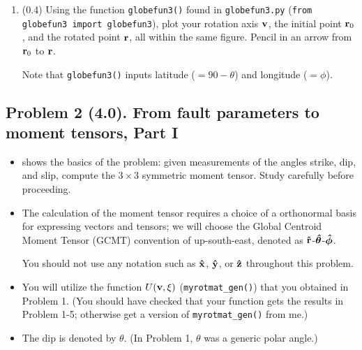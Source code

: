 \documentclass[11pt,titlepage,fleqn]{article}
\newcommand{\rotangB}{\xi}    %
\newcommand{\rotvec}{\bv}      %
\newcommand{\Umat}{U}
\begin{document}
\begin{enumerate}
\item (0.4) Using the function \verb+globefun3()+ found in \verb+globefun3.py+ (\verb+from globefun3 import globefun3+), plot your rotation axis $\rotvec$, the initial point $\mbox{${\bf r}$}_0$, and the rotated point $\mbox{${\bf r}$}$, all within the same figure. Pencil in an arrow from $\mbox{${\bf r}$}_0$ to $\mbox{${\bf r}$}$.

Note that \verb+globefun3()+ inputs latitude ($=90-\theta$) and longitude ($=\phi$).

\end{enumerate}


\subsection*{Problem 2 (4.0). From fault parameters to moment tensors, Part I}

\begin{itemize}
\item {} shows the basics of the problem: given measurements of the angles strike, dip, and slip, compute the $3 \times 3$ symmetric moment tensor. Study  carefully before proceeding.

\item The calculation of the moment tensor requires a choice of a orthonormal basis for expressing vectors and tensors; we will choose the Global Centroid Moment Tensor (GCMT) convention of up-south-east, denoted as $\mbox{\boldmath{$\hat{\rm r}$}}$-$\mbox{\boldmath{$\hat{\theta}$}}$-$\mbox{\boldmath{$\hat{\phi}$}}$.

You should not use any notation such as $\mbox{\boldmath{$\hat{\rm x}$}}$, $\mbox{\boldmath{$\hat{\rm y}$}}$, or $\mbox{\boldmath{$\hat{\rm z}$}}$ throughout this problem.

\item You will utilize the function $\Umat(\rotvec,\rotangB)$ (\verb+myrotmat_gen()+) that you obtained in Problem 1. (You should have checked that your function gets the results in Problem 1-5; otherwise get a version of \verb+myrotmat_gen()+ from me.)

\item The dip is denoted by $\theta$. (In Problem 1, $\theta$ was a generic polar angle.)

\end{itemize}
\end{document}
